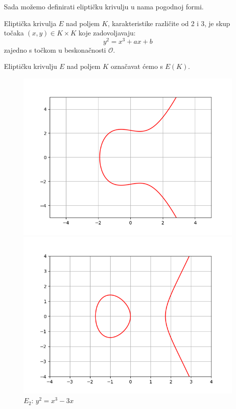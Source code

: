 \documentclass{mathos}
\begin{document}
Sada možemo definirati eliptičku krivulju u nama pogodnoj formi.
\begin{defin}
    \label{elipkriv}
    Eliptička krivulja $E$ nad poljem $K$, karakteristike različite od 2 i 3, je skup točaka $(x, y) \in K \times K$ koje zadovoljavaju:
    \[ y^2 = x^3 + ax + b \]
    zajedno s točkom u beskonačnosti $\mathcal{O}$.
\end{defin}
\begin{nap}
    Eliptičku krivulju $E$ nad poljem $K$ označavat ćemo s $E(K)$.
\end{nap}
\begin{figure}[H]
    \begin{minipage}[c]{0.5\linewidth}
        \centering
        \includegraphics[width=\linewidth,keepaspectratio]{1.png}
        \caption{$E_1$: $y^2 = x^3 -x + 5$}
    \end{minipage}
    \begin{minipage}[c]{0.5\linewidth}
        \centering
        \includegraphics[width=\linewidth,keepaspectratio]{2.png}
        \caption{$E_2$: $y^2 = x^3 -3x$}
    \end{minipage}
\end{figure}
\end{document}
